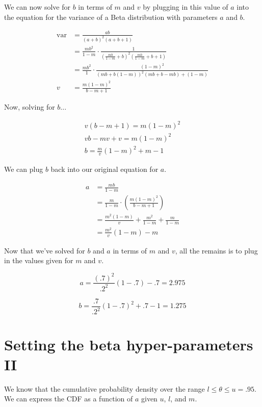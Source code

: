 \documentclass{article}
\begin{document}
We can now solve for $b$ in terms of $m$ and $v$ by plugging in this
value of $a$ into the equation for the variance of a Beta distribution
with parameters $a$ and $b$.

\begin{align*}
  \text{var} &= \frac{ab}{(a+b)^2(a+b+1)} \\
             &= \frac{mb^2}{1-m} \cdot \frac{1}{\left( \frac{mb}{1-m}
               + b \right)^2 \left ( \frac{mb}{1-m} + b + 1 \right) }
  \\
             &= \frac{mb^2}{1} \cdot \frac{(1-m)^2}{\left( mb + b(1-m)
               \right)^2 (mb + b - mb) + (1 - m)} \\
  v &= \frac{m(1 - m)^2}{b - m + 1}
\end{align*}

Now, solving for $b$...

\begin{align*}
  v(b-m+1) = m(1-m)^2 \\
  vb - mv + v = m(1-m)^2 \\
  b = \frac{m}{v}(1-m)^2 + m - 1
\end{align*}

We can plug $b$ back into our original equation for $a$.

\begin{align*}
  a &= \frac{mb}{1-m} \\
    &= \frac{m}{1-m} \cdot \left( \frac{m(1 - m)^2}{b - m + 1} \right)
  \\
    &= \frac{m^2(1-m)}{v} + \frac{m^2}{1-m} + \frac{m}{1-m} \\
    &= \frac{m^2}{v}(1-m) - m
\end{align*}

Now that we've solved for $b$ and $a$ in terms of $m$ and $v$, all the
remains is to plug in the values given for $m$ and $v$.

\begin{equation*}
  a = \frac{(.7)^2}{.2^2}(1 - .7) - .7 = 2.975
\end{equation*}

\begin{equation*}
  b = \frac{.7}{.2^2}(1 - .7)^2 + .7 - 1 = 1.275
\end{equation*}

\section{Setting the beta hyper-parameters II}

We know that the cumulative probability density over the range
$l \le \theta \le u = .95$. We can express the CDF as a function of
$a$ given $u$, $l$, and $m$.
\end{document}
